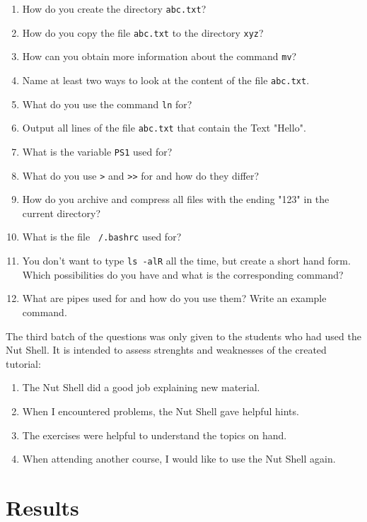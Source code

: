 \documentclass[paper=a4,twoside,abstract=on,cleardoublepage=empty,numbers=noenddot,toc=bib,toc=listof,12pt,appendixprefix=true]{scrreprt}
\begin{document}
\begin{enumerate}
    \item How do you create the directory \texttt{abc.txt}?
    \item How do you copy the file \texttt{abc.txt} to the directory \texttt{xyz}?
    \item How can you obtain more information about the command \texttt{mv}?
    \item Name at least two ways to look at the content of the file \texttt{abc.txt}.
    \item What do you use the command \texttt{ln} for?
    \item Output all lines of the file \texttt{abc.txt} that contain the Text "Hello".
    \item What is the variable \texttt{PS1} used for?
    \item What do you use \texttt{>} and \texttt{>>} for and how do they differ?
    \item How do you archive and compress all files with the ending "123" in the current directory?
    \item What is the file \texttt{~/.bashrc} used for?
    \item You don't want to type \texttt{ls -alR} all the time, but create a short hand form. Which possibilities do you have and what is the corresponding command?
    \item What are pipes used for and how do you use them? Write an example command.
\end{enumerate}

The third batch of the questions was only given to the students who had used the Nut Shell. It is intended to assess strenghts and weaknesses of the created tutorial:

\begin{enumerate}
    \item The Nut Shell did a good job explaining new material.
    \item When I encountered problems, the Nut Shell gave helpful hints.
    \item The exercises were helpful to understand the topics on hand.
    \item When attending another course, I would like to use the Nut Shell again.
\end{enumerate}

\section{Results}
\end{document}
